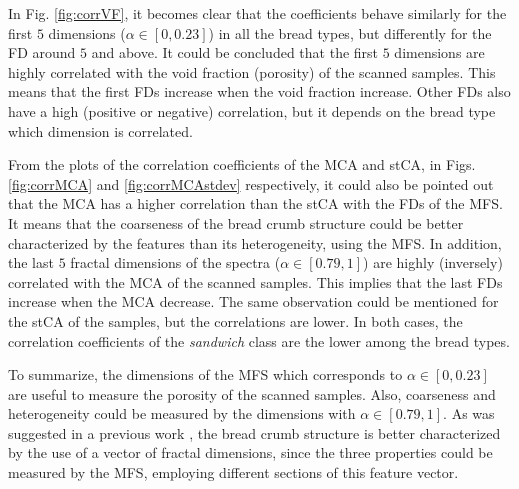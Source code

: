 In Fig. \ref{fig:corrVF}, it becomes clear that the coefficients behave similarly for the first $5$ dimensions ($\alpha \in [0,0.23]$) in all the bread types, but differently for the FD around $5$ and above. It could be concluded that the first $5$ dimensions are highly correlated with the void fraction (porosity) of the scanned samples. This means that the first FDs increase when the void fraction increase. Other FDs also have a high (positive or negative) correlation, but it depends on the bread type which dimension is correlated.

From the plots of the correlation coefficients of the MCA and stCA, in Figs. \ref{fig:corrMCA} and \ref{fig:corrMCAstdev} respectively, it could also be pointed out that the MCA has a higher correlation than the stCA with the FDs of the MFS. It means that the coarseness of the bread crumb structure could be better characterized by the features than its heterogeneity, using the MFS. In addition, the last $5$ fractal dimensions of the spectra ($\alpha \in [0.79,1]$) are highly (inversely) correlated with the MCA of the scanned samples. This implies that the last FDs increase when the MCA decrease. The same observation could be mentioned for the stCA of the samples, but the correlations are lower. In both cases, the correlation coefficients of the {\em sandwich} class are the lower among the bread types.

To summarize, the dimensions of the MFS which corresponds to $\alpha \in [0,0.23]$ are useful to measure the porosity of the scanned samples. Also, coarseness and heterogeneity could be measured by the dimensions with $\alpha \in [0.79,1]$. As was suggested in a previous work \cite{Gonzales2008}, the bread crumb structure is better characterized by the use of a vector of fractal dimensions, since the three properties could be measured by the MFS, employing different sections of this feature vector.


